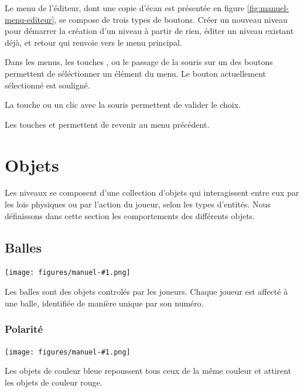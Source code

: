 Le menu de l'éditeur, dont une copie d'écan est présentée en figure
\ref{fig:manuel-menu-editeur}, se compose de trois types de boutons.
Créer un nouveau niveau pour démarrer la création d'un niveau à partir
de rien, éditer un niveau existant déjà, et retour qui renvoie vers
le menu principal.

Dans les menus, les touches \fbox{$\uparrow$}, \fbox{$\downarrow$} ou
le passage de la souris sur un des boutons permettent de séléctionner un
élément du menu. Le bouton actuellement sélectionné est souligné.

La touche  ou un clic avec la souris permettent de valider le choix.

Les touches \fbox{$\longleftarrow$} et  permettent de revenir
au menu précédent.

\section{Objets}
\newcommand{\objectsymbol}[1]{
    \texttt{[image: figures/manuel-\#1.png]}
}

\newcommand{\describeobject}[2]{
    \noindent
    \begin{minipage}{.08\textwidth}
        \objectsymbol{#1}
    \end{minipage}
    \begin{minipage}{.9\textwidth}
        #2
    \end{minipage}
}

Les niveaux se composent d'une collection d'objets qui
interagissent entre eux par les lois physiques ou par
l'action du joueur, selon les types d'entités. Nous
définissons dans cette section les comportements
des différents objets.

\subsection{Balles}

\describeobject{ball}{
    Les balles sont des objets controlés par les joueurs. Chaque joueur
    est affecté à une balle, identifiée de manière unique par son numéro.
}

\subsubsection{Polarité}

\describeobject{charge-neg}{
    Les objets de couleur bleue repoussent tous ceux de la même couleur
    et attirent les objets de couleur rouge.
}

